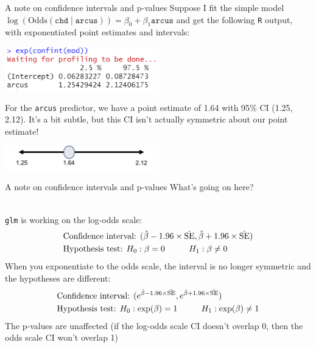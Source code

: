 \documentclass[10pt,t]{beamer}
\newcommand\tab[1][1cm]{\hspace*{#1}}
\begin{document}
\begin{frame}{A note on confidence intervals and p-values}
	\vspace{-0.7cm}
	Suppose I fit the simple model $\log(\text{Odds}(\texttt{chd} \mid \texttt{arcus})) = \beta_0 + \beta_1 \texttt{arcus}$ and get the following \texttt{R} output, with exponentiated point estimates and intervals: 
	
	\begin{center}
	\includegraphics[width=0.5\textwidth]{./figs/asymmetric_CI}
	\end{center}
	For the \texttt{arcus} predictor, we have a point estimate of 1.64 with 95\% CI (1.25, 2.12). It's a bit subtle, but this CI isn't actually symmetric about our point estimate!
		\begin{center}
		\includegraphics[width=0.5\textwidth]{./figs/asymmetric_CI_pic}
	\end{center}
\end{frame}

\begin{frame}{A note on confidence intervals and p-values}
	What's going on here? 
	\\ ~\
	
	\texttt{glm} is working on the log-odds scale:
	\begin{align*}
		&\text{Confidence interval: }(\hat{\beta} - 1.96 \times \hat{\text{SE}}, \hat{\beta} + 1.96 \times \hat{\text{SE}})\\
		&\text{Hypothesis test: }H_0: \beta = 0 \tab H_1: \beta \neq 0
	\end{align*}
	When you exponentiate to the odds scale, the interval is no longer symmetric and the hypotheses are different:
	\begin{align*}
		&\text{Confidence interval: }(e^{\hat{\beta} - 1.96 \times \hat{\text{SE}}}, e^{\hat{\beta} + 1.96 \times \hat{\text{SE}}})\\
		&\text{Hypothesis test: }H_0: \exp(\beta) = 1 \tab H_1: \exp(\beta) \neq 1
	\end{align*} 
	The p-values are unaffected (if the log-odds scale CI doesn't overlap 0, then the odds scale CI won't overlap 1)
\end{frame}
\end{document}

